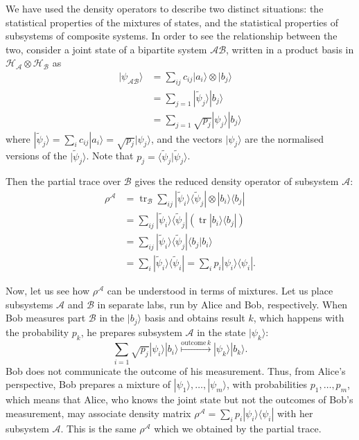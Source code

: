 \documentclass[fleqn]{article}
\begin{document}
We have used the density operators to describe two distinct situations: the statistical properties of the mixtures of states, and the statistical properties of subsystems of composite systems.
In order to see the relationship between the two, consider a joint state of a bipartite system \(\mathcal{AB}\), written in a product basis in \(\mathcal{H}_{\mathcal{A}}\otimes\mathcal{H}_{\mathcal{B}}\) as
\[
  \begin{aligned}
    |\psi_{\mathcal{AB}}\rangle
    &= \sum_{ij} c_{ij}|a_i\rangle\otimes|b_j\rangle
  \\&= \sum_{j=1} |\widetilde\psi_j\rangle|b_j\rangle
  \\&= \sum_{j=1} \sqrt{p_j}|\psi_j\rangle|b_j\rangle
  \end{aligned}
\tag{9.7.1}
\]
where \(|\widetilde\psi_j\rangle = \sum_i c_{ij}|a_i\rangle = \sqrt{p_j}|\psi_j\rangle\), and the vectors \(|\psi_j\rangle\) are the normalised versions of the \(|\widetilde\psi_j\rangle\).
Note that \(p_j=\langle\widetilde\psi_j|\widetilde\psi_j\rangle\).

Then the partial trace over \(\mathcal{B}\) gives the reduced density operator of subsystem \(\mathcal{A}\):
\[
  \begin{aligned}
    \rho^{\mathcal{A}}
    &=\operatorname{tr}_{\mathcal{B}} \sum_{ij} |\widetilde\psi_i\rangle\langle\widetilde\psi_j| \otimes |b_i\rangle\langle b_j|
  \\&= \sum_{ij} |\widetilde\psi_i\rangle\langle\widetilde\psi_j| (\operatorname{tr}|b_i\rangle\langle b_j|)
  \\&= \sum_{ij} |\widetilde\psi_i\rangle\langle\widetilde\psi_j| \langle b_j|b_i\rangle
  \\&= \sum_{i} |\widetilde\psi_i\rangle\langle\widetilde\psi_i|
    = \sum_{i} p_i |\psi_i\rangle\langle\psi_i|.
  \end{aligned}
\]

Now, let us see how \(\rho^{\mathcal{A}}\) can be understood in terms of mixtures.
Let us place subsystems \(\mathcal{A}\) and \(\mathcal{B}\) in separate labs, run by Alice and Bob, respectively.
When Bob measures part \(\mathcal{B}\) in the \(|b_j\rangle\) basis and obtains result \(k\), which happens with the probability \(p_k\), he prepares subsystem \(\mathcal{A}\) in the state \(|\psi_k\rangle\):
\[
  \sum_{i=1} \sqrt{p_j}|\psi_i\rangle|b_i\rangle
  \overset{\mathrm{outcome}\,k}{\longmapsto}
  |\psi_k\rangle|b_k\rangle.
\]
Bob does not communicate the outcome of his measurement.
Thus, from Alice's perspective, Bob prepares a mixture of \(|\psi_1\rangle,\ldots,|\psi_m\rangle\), with probabilities \(p_1,\ldots,p_m\), which means that Alice, who knows the joint state but not the outcomes of Bob's measurement, may associate density matrix \(\rho^\mathcal{A}=\sum_i p_i|\psi_i\rangle\langle\psi_i|\) with her subsystem \(\mathcal{A}\).
This is the same \(\rho^{\mathcal{A}}\) which we obtained by the partial trace.
\end{document}
